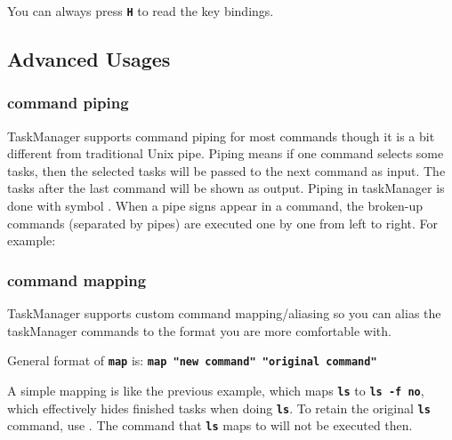 \documentclass[12pt, a4paper]{article}
\newcommand{\cmd}[1]{{\bf \texttt{\begin{quote} #1 \end{quote}}}}
\newcommand{\cmdinline}[1]{{\bf \texttt{#1}}}
\begin{document}
You can always press \cmdinline{H} to read the key bindings.

\subsection{Advanced Usages}
\subsubsection{command piping}
\noindent \cmd{> \ ls \textbar \  rm}
TaskManager supports command piping for most commands though it is a bit different from traditional Unix pipe.
Piping means if one command selects some tasks, then the selected tasks will be passed to the next command as input. The tasks after the last command will be shown as output.
Piping in taskManager is done with symbol \cmdinline{\textbar}. When a pipe signs appear in a command, the broken-up commands (separated by pipes) are executed one by one from left to right. For example:


\subsubsection{command mapping}
\noindent \cmd{> \ map "ls" "ls -f no"}
TaskManager supports custom command mapping/aliasing so you can alias the taskManager commands to the format you are more comfortable with.

General format of \cmdinline{map} is: \cmdinline{map "new command" "original command"}

A simple mapping is like the previous example, which maps \cmdinline{ls} to \cmdinline{ls -f no}, which effectively hides finished tasks when doing \cmdinline{ls}.
To retain the original \cmdinline{ls} command, use \cmdinline{\ls}. The command that \cmdinline{ls} maps to will not be executed then.
\end{document}
